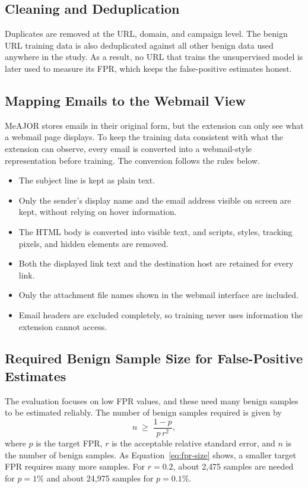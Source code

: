 \documentclass{FastFyp}
\begin{document}
\subsection{Cleaning and Deduplication}
Duplicates are removed at the URL, domain, and campaign level. The benign URL training data is also deduplicated against all other benign data used anywhere in the study. As a result, no URL that trains the unsupervised model is later used to measure its FPR, which keeps the false-positive estimates honest.

\subsection{Mapping Emails to the Webmail View}
\label{sec:email-mapping}
MeAJOR stores emails in their original form, but the extension can only see what a webmail page displays. To keep the training data consistent with what the extension can observe, every email is converted into a webmail-style representation before training. The conversion follows the rules below.
\begin{itemize}
    \item The subject line is kept as plain text.
    \item Only the sender's display name and the email address visible on screen are kept, without relying on hover information.
    \item The HTML body is converted into visible text, and scripts, styles, tracking pixels, and hidden elements are removed.
    \item Both the displayed link text and the destination host are retained for every link.
    \item Only the attachment file names shown in the webmail interface are included.
    \item Email headers are excluded completely, so training never uses information the extension cannot access.
\end{itemize}

\subsection{Required Benign Sample Size for False-Positive Estimates}
\label{sec:fpr-size}
The evaluation focuses on low FPR values, and these need many benign samples to be estimated reliably. The number of benign samples required is given by
\begin{equation}
n \;\ge\; \frac{1-p}{p\, r^{2}},
\label{eq:fpr-size}
\end{equation}
where $p$ is the target FPR, $r$ is the acceptable relative standard error, and $n$ is the number of benign samples. As Equation~\ref{eq:fpr-size} shows, a smaller target FPR requires many more samples. For $r = 0.2$, about 2{,}475 samples are needed for $p = 1\%$ and about 24{,}975 samples for $p = 0.1\%$.
\end{document}
